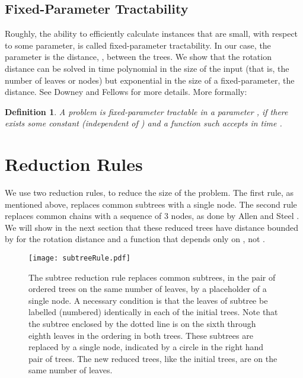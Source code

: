 \documentclass[12pt]{article}
\newtheorem{definition}{Definition}
\begin{document}
\subsection*{Fixed-Parameter Tractability}



Roughly, the ability to efficiently calculate instances that are small, with respect
to some parameter, is called fixed-parameter tractability.  In our case,
the parameter is the distance, , between the trees.  We show
that the rotation distance can be solved in time 
polynomial in the size of the input (that is, the number of leaves or nodes) 
but exponential in the size of a 
fixed-parameter,  the distance.  See Downey and Fellows \cite{Downey1999}
for more details.  More formally:

\begin{definition}  A problem  is {\em fixed-parameter tractable} in 
a parameter , if there exists some constant  (independent of )
and a function  such  accepts  in time .
\end{definition}


\section{Reduction Rules}

We use two reduction rules,  to reduce the size
of the problem.  The first rule, as mentioned above, 
replaces common subtrees with a single node.  The
second rule replaces common chains with a sequence
of 3 nodes, as done by Allen and Steel \cite{allenSteel}.
We will show in the next section 
that these reduced trees have distance bounded
by  for  the rotation distance and  
a function that depends only on , not .

\begin{figure}

\begin{center}
\texttt{[image: subtreeRule.pdf]}
\end{center}
\caption{\small The subtree reduction rule replaces common subtrees, in the pair of ordered
trees on the same number of leaves, 
by a placeholder of a single node.  A necessary condition is that the leaves of
subtree be labelled (numbered) identically in each of the initial trees.  Note that the subtree enclosed
by the dotted line is on the sixth through eighth leaves in the ordering in both trees.
These subtrees are replaced by a single node, indicated by a circle in the right hand
pair of trees.  The new reduced trees, like the initial trees, are on the same number
of leaves. }
\label{subtreeRuleFigure}
\end{figure}
\end{document}
